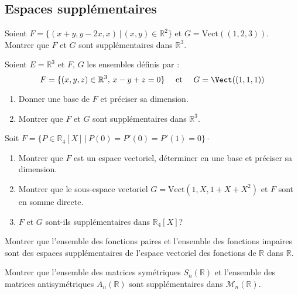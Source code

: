 \documentclass[a4paper,twoside,french,11pt]{VcCours}
\begin{document}
\medskip

\subsection{Espaces supplémentaires}

\medskip

\begin{Exercice}{} Soient $F= \lbrace (x+y,y-2x, x) \, \vert \,  (x,y) \in \mathbb{R}^2 \rbrace$ et $G = \textrm{Vect}((1,2,3))$. Montrer que $F$ et $G$ sont supplémentaires dans $\mathbb{R}^3$.
\end{Exercice} 

\begin{Exercice}{} Soient $E= \mathbb{R}^3$ et $F$, $G$ les ensembles définis par :
$$ F = \lbrace (x,y,z) \in \mathbb{R}^3, \, x-y+z=0 \rbrace \quad \hbox{ et }  \quad G = \Vect((1,1,1)) $$

\begin{enumerate}
\item Donner une base de $F$ et préciser sa dimension.
\item Montrer que $F$ et $G$ sont supplémentaires dans $\mathbb{R}^3$.
\end{enumerate}
\end{Exercice}

\begin{Exercice}{} Soit $F = \lbrace P \in \mathbb{R}_4[X] \, \vert \, P(0)=P'(0)=P'(1)=0 \rbrace \cdot$

\begin{enumerate}
\item Montrer que $F$ est un espace vectoriel, déterminer en une base et préciser sa dimension.
\item Montrer que le sous-espace vectoriel $G= \textrm{Vect}(1,X,1+X+X^2)$ et $F$  sont en somme directe.
\item $F$ et $G$ sont-ils supplémentaires dans $\mathbb{R}_4[X]$?
\end{enumerate}
\end{Exercice}

\begin{Exercice}{} Montrer que l'ensemble des fonctions paires et l'ensemble des fonctions impaires sont des espaces supplémentaires de l'espace vectoriel des fonctions de $\mathbb{R}$ dans $\mathbb{R}$. 
\end{Exercice}


\begin{Exercice}{} Montrer que l'ensemble des matrices symétriques $S_n(\mathbb{R})$ et l'ensemble des matrices antisymétriques $A_n(\mathbb{R})$ sont supplémentaires dans $\mathcal{M}_n(\mathbb{R})$.
\end{Exercice}
\end{document}

